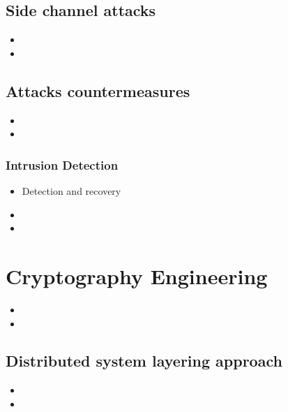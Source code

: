\documentclass[10pt,a4paper,twoside]{llncs}
\begin{document}
\subsection{Side channel attacks \label{sec:sideChannelAttacks}}

\begin{itemize}
    \item
    \item 
\end{itemize}


\subsection{Attacks countermeasures \label{sec:countermeasures}}

\begin{itemize}
    \item
    \item 
\end{itemize}


\subsubsection{Intrusion Detection \label{sec:intrusionDetection}}

\begin{itemize}
    \item Detection and recovery
    \item 
    \item 
\end{itemize}


\section{Cryptography Engineering \label{sec:CryptoEng}}

\begin{itemize}
    \item
    \item 
\end{itemize}


\subsection{Distributed system layering approach \label{sec:layering}}

\begin{itemize}
    \item
    \item 
\end{itemize}
\end{document}
